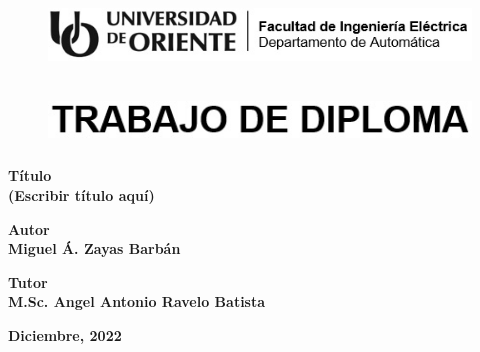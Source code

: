 \thispagestyle{empty}


\begin{figure}[h]
    \centering
    \includegraphics[width=15cm, height=2cm]{imagenes/identidad en blanco y negro.jpg}
\end{figure}

\vspace{1cm}

\begin{figure}[h]
    \centering
    \includegraphics[width=14cm, height=1.5cm]{imagenes/trabajo de diploma}
\end{figure}

\vspace{1cm}

\begin{center}
    \textbf{\large
        Título\\
        (Escribir título aquí)}
    \vspace{0.5cm}

    \textbf{\large Autor\\
    Miguel Á. Zayas Barbán}
    \vspace{0.5cm}

    \textbf{\large Tutor\\
    M.Sc. Angel Antonio Ravelo Batista}

    \vfill
    \textbf{\large Diciembre, 2022}   
\end{center}

 
